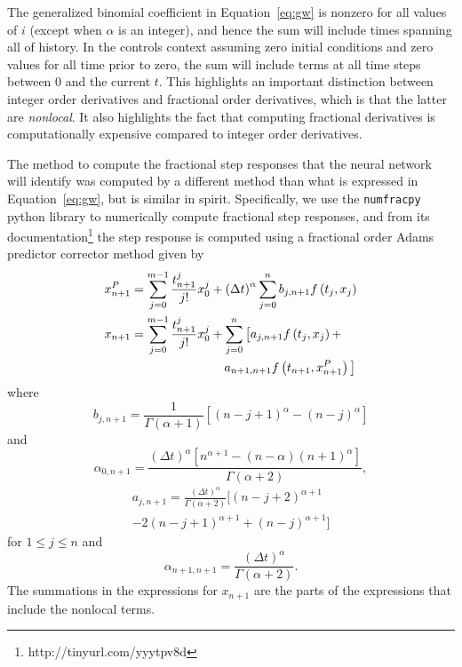   The generalized binomial coefficient in Equation~\ref{eq:gw} is nonzero for
  all values of $i$ (except when $\alpha$ is an integer), and hence the sum
  will include times spanning all of history. In the controls context assuming
  zero initial conditions and zero values for all time prior to zero, the sum
  will include terms at all time steps between $0$ and the current $t$. This
  highlights an important distinction between integer order derivatives and
  fractional order derivatives, which is that the latter are \emph{nonlocal}.
  It also highlights the fact that computing fractional derivatives is
  computationally expensive compared to integer order derivatives. 

  The method to compute the fractional step responses that the neural network
  will identify was computed by a different method than what is expressed in
  Equation~\ref{eq:gw}, but is similar in spirit. Specifically, we use the
  \texttt{numfracpy} python library to numerically compute fractional step
  responses, and from its documentation\footnote{http://tinyurl.com/yyytpv8d} the step response is computed using a
  fractional order Adams predictor corrector method given by
  \begin{align*}
  x^P_{n+1} &= \sum_{j=0}^{m-1} \frac{t^j_{n+1}}{j!}x_0^j + \left( \Delta t
  \right)^\alpha \sum_{j=0}^n b_{j,n+1} f\left( t_j, x_j \right) \\
  x_{n+1} &=  \sum_{j=0}^{m-1} \frac{t^j_{n+1}}{j!}x_0^j + \sum_{j=0}^n \big[ a_{j,n+1}
  f \left( t_j, x_j \right) + \\ &\  \hspace*{1in} a_{n+1,n+1} f\left( t_{n+1},
x^P_{n+1} \right) \big]
  \end{align*}
  where
  \[
  b_{j,n+1} = \frac{1}{\Gamma (\alpha + 1 )} \left[(n-j+1)^\alpha -
  (n-j)^\alpha \right]
  \] and
  \[\alpha_{0,n+1} = \frac{\left(\Delta t \right)^\alpha \left[n^{\alpha + 1} -
  (n-\alpha)(n+1)^\alpha\right]}{\Gamma \left( \alpha + 2 \right)},
  \]
  \begin{multline*}
  a_{j,n+1} = \frac{\left( \Delta t \right)^\alpha}{\Gamma \left( \alpha + 2
  \right)} \big[ (n-j+2)^{\alpha + 1} \\
  -2 (n - j + 1)^{\alpha + 1} + (n-j)^{\alpha + 1} \big]
  \end{multline*} for $1 \leq j \leq n$
  and
  \[
  \alpha_{n+1,n+1} = \frac{\left( \Delta t \right)^\alpha}{\Gamma\left(\alpha +
  2\right)}.
  \]
  The summations in the expressions for $x_{n+1}$ are the parts of the
  expressions that include the nonlocal terms.
